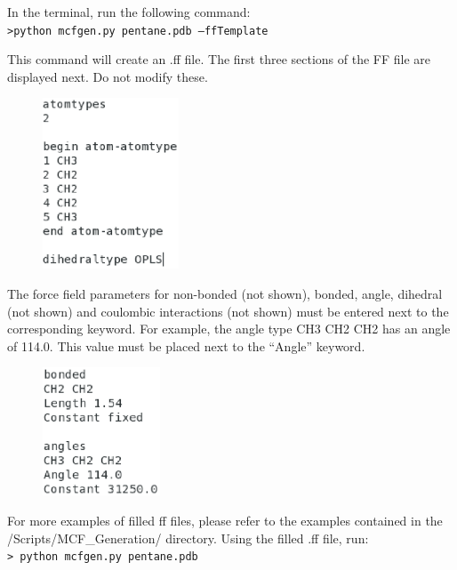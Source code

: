 In the terminal, run the following command:\\
\texttt{>python mcfgen.py pentane.pdb --ffTemplate}

This command will create an .ff file. The first three sections of the FF file are displayed next. 
Do not modify these.

\begin{figure}[h]
\begin{center}
\includegraphics[height=2in]{top_ff.eps}
\end{center}
\end{figure}

The force field parameters for non-bonded (not shown), bonded, angle, dihedral (not shown)
and coulombic interactions (not shown) must be entered next to the corresponding keyword.
For example, the angle type CH3 CH2 CH2 has an angle of 114.0. This value must be placed
next to the ``Angle'' keyword.

\begin{figure}[h]
\begin{center}
\includegraphics[height=1.5in]{body_ff.eps}
\end{center}
\end{figure}

\vspace{3in}
For more examples of filled ff files, please refer to the examples contained in the /Scripts/MCF\_Generation/ directory. Using the
filled .ff file, run: \\

\texttt{> python mcfgen.py pentane.pdb} \\

